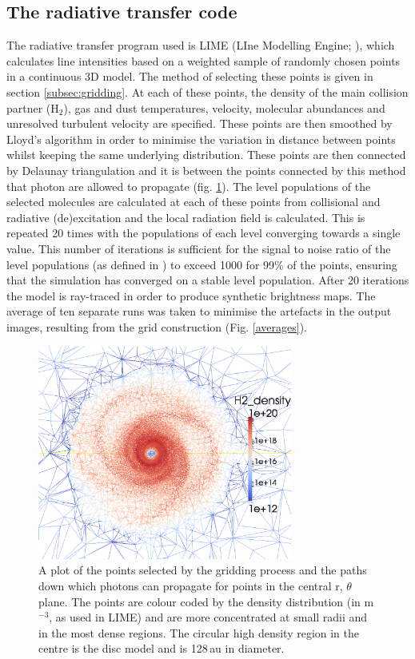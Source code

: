 \documentclass[useAMS,usenatbib]{mn2e}
\begin{document}
\subsection{The radiative transfer code} \label{subsec:radiative_transfer_code}
The radiative transfer program used is LIME (LIne Modelling Engine; \citealt{Brinch2010}), which  calculates line intensities based on a weighted sample of randomly chosen points in a continuous 3D model. The method of selecting these points is given in section \ref{subsec:gridding}. At each of these points, the density of the main collision partner (H$_2$), gas and dust temperatures, velocity, molecular abundances and unresolved turbulent velocity are specified. These points are then smoothed by Lloyd's algorithm \citep{Lloyd1982} in order to minimise the variation in distance between points whilst keeping the same underlying distribution. These points are then connected by Delaunay triangulation and it is between the points connected by this method that photon are allowed to propagate (fig. \ref{grid}). The level populations of the selected molecules are calculated at each of these points from collisional and radiative (de)excitation and the local radiation field is calculated. This is repeated 20 times with the populations of each level converging towards a single value. This number of iterations is sufficient for the signal to noise ratio of the level populations (as defined in \citealt{Brinch2010}) to exceed 1000 for 99\% of the points, ensuring that the simulation has converged on a stable level population. After 20 iterations the model is ray-traced in order to produce synthetic brightness maps. The average of ten separate runs was taken to minimise the artefacts in the output images, resulting from the grid construction (Fig. \ref{averages}).


\begin{figure}
 \includegraphics[width=84mm]{Figures/model/lime3.eps}
 \caption{A plot of the points selected by the gridding process and the paths down which photons can propagate for points in the central r, $\theta$ plane. The points are colour coded by the density distribution (in m$^{-3}$, as used in LIME) and are more concentrated at small radii and in the most dense regions. The circular high density region in the centre is the disc model and is 128$\,$au in diameter.}
 \label{grid}
\end{figure}
\end{document}
